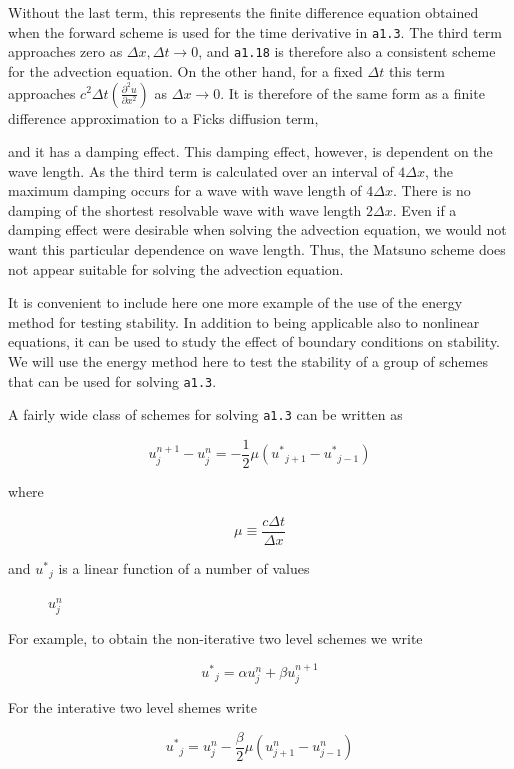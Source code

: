 Without the last term, this represents the finite difference equation
obtained when the forward scheme is used for the time derivative in
\texttt{a1.3}. The third term approaches zero as
\(\Delta x,\Delta t \rightarrow 0\), and \texttt{a1.18} is therefore
also a consistent scheme for the advection equation. On the other hand,
for a fixed \(\Delta t\) this term approaches
\(c^{2}\Delta t\left( \frac{\partial^{2}u}{\partial x^{2}} \right)\) as
\(\Delta x \rightarrow 0\). It is therefore of the same form as a finite
difference approximation to a Fick\textquotesingle s diffusion term,

and it has a damping effect. This damping effect, however, is dependent
on the wave length. As the third term is calculated over an interval of
\(4\Delta x\), the maximum damping occurs for a wave with wave length of
\(4\Delta x\). There is no damping of the shortest resolvable wave with
wave length \(2\Delta x\). Even if a damping effect were desirable when
solving the advection equation, we would not want this particular
dependence on wave length. Thus, the Matsuno scheme does not appear
suitable for solving the advection equation.

It is convenient to include here one more example of the use of the
energy method for testing stability. In addition to being applicable
also to nonlinear equations, it can be used to study the effect of
boundary conditions on stability. We will use the energy method here to
test the stability of a group of schemes that can be used for solving
\texttt{a1.3}.

A fairly wide class of schemes for solving \texttt{a1.3} can be written
as

 \[u_{j}^{n + 1} - u_{j}^{n} = - \frac{1}{2}\mu\left( {u^{*}}_{j + 1} - {u^{*}}_{j - 1} \right)\]

where

 \[\mu \equiv \frac{c\Delta t}{\Delta x}\]

\begin{description}
 \item[and \({u^{*}}_{j}\) is a linear function of a number of values]
 \(u_{j}^{n}\)
\end{description}

For example, to obtain the non-iterative two level schemes we write

 \[{u^{*}}_{j} = \alpha u_{j}^{n} + \beta u_{j}^{n + 1}\]

For the interative two level shemes write

 \[{u^{*}}_{j} = u_{j}^{n} - \frac{\beta}{2}\mu\left( u_{j + 1}^{n} - u_{j - 1}^{n} \right)\]

